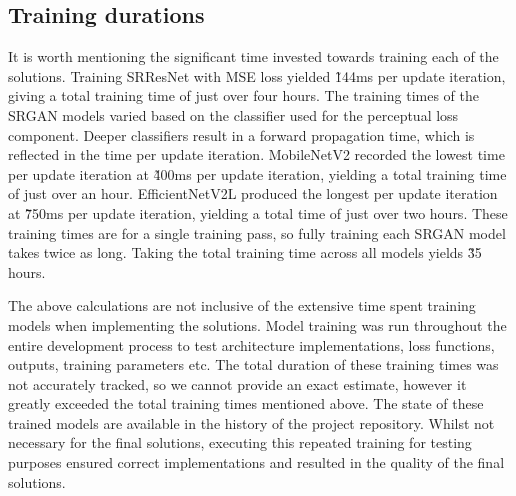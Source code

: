 \subsection{Training durations}
It is worth mentioning the significant time invested towards training each of the solutions. Training SRResNet with MSE loss yielded \~144ms per update iteration, giving a total training time of just over four hours. The training times of the SRGAN models varied based on the classifier used for the perceptual loss component. Deeper classifiers result in a forward propagation time, which is reflected in the time per update iteration. MobileNetV2 recorded the lowest time per update iteration at \~400ms per update iteration, yielding a total training time of just over an hour. EfficientNetV2L produced the longest per update iteration at \~750ms per update iteration, yielding a total time of just over two hours. These training times are for a single training pass, so fully training each SRGAN model takes twice as long. Taking the total training time across all models yields \~35 hours.

The above calculations are not inclusive of the extensive time spent training models when implementing the solutions. Model training was run throughout the entire development process to test architecture implementations, loss functions, outputs, training parameters etc. The total duration of these training times was not accurately tracked, so we cannot provide an exact estimate, however it greatly exceeded the total training times mentioned above. The state of these trained models are available in the history of the project repository. Whilst not necessary for the final solutions, executing this repeated training for testing purposes ensured correct implementations and resulted in the quality of the final solutions. 

